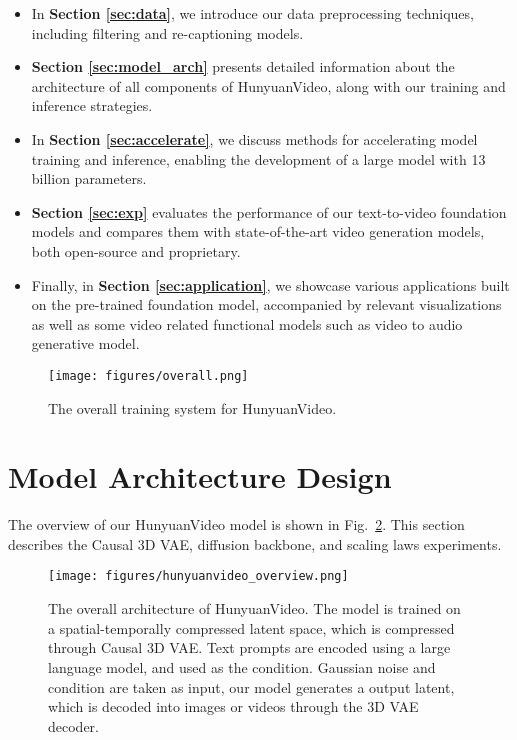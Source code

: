 \documentclass{article}
\newcommand{\nameofmethod}{HunyuanVideo}
\newif \ifhq
\begin{document}
\begin{itemize}
    \item In \textbf{Section \ref{sec:data}}, we introduce our data preprocessing techniques, including filtering and re-captioning models.
    \item \textbf{Section \ref{sec:model_arch}} presents detailed information about the architecture of all components of \nameofmethod{}, along with our training and inference strategies.
    \item In \textbf{Section \ref{sec:accelerate}}, we discuss methods for accelerating model training and inference, enabling the development of a large model with 13 billion parameters.
    \item \textbf{Section \ref{sec:exp}} evaluates the performance of our text-to-video foundation models and compares them with state-of-the-art video generation models, both open-source and proprietary.
    \item Finally, in \textbf{Section \ref{sec:application}}, we showcase various applications built on the pre-trained foundation model, accompanied by relevant visualizations as well as some video related functional models such as video to audio generative model.
\end{itemize}
\begin{figure}[h]
    \hfill
    \ifhq
    \texttt{[image: hqfigures/overall.pdf]}
    \else
    \texttt{[image: figures/overall.png]}
    \fi
    \caption{The overall training system for \nameofmethod{}.}
    \label{fig:pipeline_overview}
\end{figure}



\section{Model Architecture Design}
The overview of our \nameofmethod{} model is shown in Fig.~\ref{fig:hunyuanvideo_overview}. This section describes the Causal 3D VAE, diffusion backbone, and scaling laws experiments.

\label{sec:model_arch}
\begin{figure}[t]
    \centering
    \ifhq
    \texttt{[image: hqfigures/hunyuanvideo\_overview.pdf]}
    \else
    \texttt{[image: figures/hunyuanvideo\_overview.png]}
    \fi
    \caption{The overall architecture of \nameofmethod{}. The model is trained on a spatial-temporally compressed latent space, which is compressed through Causal 3D VAE. Text prompts are encoded using a large language model, and used as the condition. Gaussian noise and condition are taken as input, our model generates a output latent, which is decoded into images or videos through the 3D VAE decoder.}
    \label{fig:hunyuanvideo_overview}
\end{figure}
\end{document}
